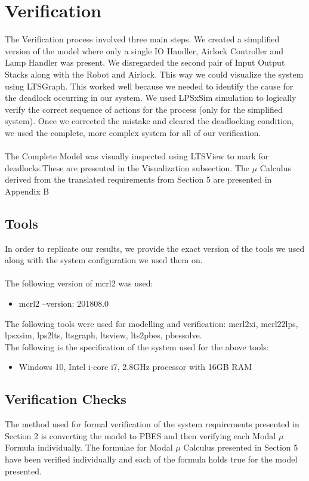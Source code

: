 \documentclass[a4paper,12pt]{article}
\begin{document}
	\section{Verification}
	The Verification process involved three main steps. We created a simplified version of the model where only a single IO Handler, Airlock Controller and Lamp Handler was present. We disregarded the second pair of Input Output Stacks along with the Robot and Airlock. This way we could visualize the system using LTSGraph. This worked well because we needed to identify the cause for the deadlock occurring in our system. We used LPSxSim simulation to logically verify the correct sequence of actions for the process (only for the simplified system). Once we corrected the mistake and cleared the deadlocking condition, we used the complete, more complex system for all of our verification.
	\\
	\\The Complete Model was visually inspected using LTSView to mark for deadlocks.These are presented in the Visualization subsection. The $\mu$ Calculus derived from the translated requirements from Section 5 are presented in Appendix B 
	\subsection{Tools}
	In order to replicate our results, we provide the exact version of the tools we used along with the system configuration we used them on.
	\\
	\\The following version of mcrl2 was used:
	\begin{itemize}
		\item mcrl2 --version: 201808.0
	\end{itemize}
	The following tools were used for modelling and verification: mcrl2xi, mcrl22lps, lpsxsim, lps2lts, ltsgraph, ltsview, lts2pbes, pbessolve.
	\\The following is the specification of the system used for the above tools:
	\begin{itemize}
		\item Windows 10, Intel i-core i7, 2.8GHz processor with 16GB RAM 
	\end{itemize}
	\subsection{Verification Checks}
	The method used for formal verification of the system requirements presented in Section 2 is converting the model to PBES and then verifying each Modal $\mu$ Formula individually. The formulae for Modal $\mu$ Calculus presented in Section 5 have been verified individually and each of the formula holds true for the model presented.
\end{document}
